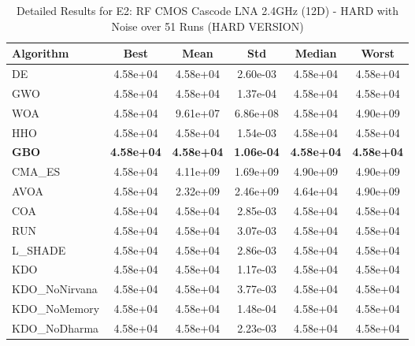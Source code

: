 \begin{table}[htbp]
\centering
\caption{Detailed Results for E2: RF CMOS Cascode LNA 2.4GHz (12D) - HARD with Noise over 51 Runs (HARD VERSION)}
\label{tab:P2_detailed}
\small
\begin{tabular}{lccccc}
\toprule
\textbf{Algorithm} & \textbf{Best} & \textbf{Mean} & \textbf{Std} & \textbf{Median} & \textbf{Worst} \\
\midrule
DE & 4.58e+04 & 4.58e+04 & 2.60e-03 & 4.58e+04 & 4.58e+04 \\
GWO & 4.58e+04 & 4.58e+04 & 1.37e-04 & 4.58e+04 & 4.58e+04 \\
WOA & 4.58e+04 & 9.61e+07 & 6.86e+08 & 4.58e+04 & 4.90e+09 \\
HHO & 4.58e+04 & 4.58e+04 & 1.54e-03 & 4.58e+04 & 4.58e+04 \\
\textbf{GBO} & \textbf{4.58e+04} & \textbf{4.58e+04} & \textbf{1.06e-04} & \textbf{4.58e+04} & \textbf{4.58e+04} \\
CMA_ES & 4.58e+04 & 4.11e+09 & 1.69e+09 & 4.90e+09 & 4.90e+09 \\
AVOA & 4.58e+04 & 2.32e+09 & 2.46e+09 & 4.64e+04 & 4.90e+09 \\
COA & 4.58e+04 & 4.58e+04 & 2.85e-03 & 4.58e+04 & 4.58e+04 \\
RUN & 4.58e+04 & 4.58e+04 & 3.07e-03 & 4.58e+04 & 4.58e+04 \\
L_SHADE & 4.58e+04 & 4.58e+04 & 2.86e-03 & 4.58e+04 & 4.58e+04 \\
KDO & 4.58e+04 & 4.58e+04 & 1.17e-03 & 4.58e+04 & 4.58e+04 \\
KDO_NoNirvana & 4.58e+04 & 4.58e+04 & 3.77e-03 & 4.58e+04 & 4.58e+04 \\
KDO_NoMemory & 4.58e+04 & 4.58e+04 & 1.48e-04 & 4.58e+04 & 4.58e+04 \\
KDO_NoDharma & 4.58e+04 & 4.58e+04 & 2.23e-03 & 4.58e+04 & 4.58e+04 \\
\bottomrule
\end{tabular}
\end{table}
